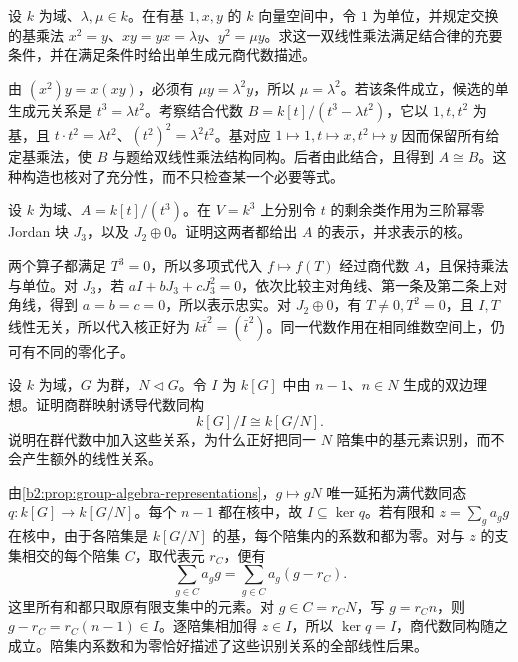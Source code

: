 \begin{exercise}\label{b2:ex:11-associative-table}
	设 \(k\) 为域、\(\lambda,\mu\in k\)。在有基 \(1,x,y\) 的 \(k\) 向量空间中，令 \(1\) 为单位，并规定交换的基乘法 \(x^2=y\)、\(xy=yx=\lambda y\)、\(y^2=\mu y\)。求这一双线性乘法满足结合律的充要条件，并在满足条件时给出单生成元商代数描述。
\end{exercise}
\begin{solution}
	由 \((x^2)y=x(xy)\)，必须有 \(\mu y=\lambda^2y\)，所以 \(\mu=\lambda^2\)。若该条件成立，候选的单生成元关系是 \(t^3=\lambda t^2\)。考察结合代数 \(B=k[t]/(t^3-\lambda t^2)\)，它以 \(1,t,t^2\) 为基，且 \(t\cdot t^2=\lambda t^2\)、\((t^2)^2=\lambda^2t^2\)。基对应 \(1\mapsto1,t\mapsto x,t^2\mapsto y\) 因而保留所有给定基乘法，使 \(B\) 与题给双线性乘法结构同构。后者由此结合，且得到 \(A\cong B\)。这种构造也核对了充分性，而不只检查某一个必要等式。
\end{solution}

\begin{exercise}\label{b2:ex:11-nilpotent-representation}
	设 \(k\) 为域、\(A=k[t]/(t^3)\)。在 \(V=k^3\) 上分别令 \(t\) 的剩余类作用为三阶幂零 Jordan 块 \(J_3\)，以及 \(J_2\oplus0\)。证明这两者都给出 \(A\) 的表示，并求表示的核。
\end{exercise}
\begin{solution}
	两个算子都满足 \(T^3=0\)，所以多项式代入 \(f\mapsto f(T)\) 经过商代数 \(A\)，且保持乘法与单位。对 \(J_3\)，若 \(aI+bJ_3+cJ_3^2=0\)，依次比较主对角线、第一条及第二条上对角线，得到 \(a=b=c=0\)，所以表示忠实。对 \(J_2\oplus0\)，有 \(T\ne0,T^2=0\)，且 \(I,T\) 线性无关，所以代入核正好为 \(k\bar t^2=(\bar t^2)\)。同一代数作用在相同维数空间上，仍可有不同的零化子。
\end{solution}

\begin{exercise}\label{b2:ex:11-group-algebra-universal}
	设 \(k\) 为域，\(G\) 为群，\(N\triangleleft G\)。令 \(I\) 为 \(k[G]\) 中由 \(n-1\)、\(n\in N\) 生成的双边理想。证明商群映射诱导代数同构
	\[
		k[G]/I\cong k[G/N].
	\]
	说明在群代数中加入这些关系，为什么正好把同一 \(N\) 陪集中的基元素识别，而不会产生额外的线性关系。
\end{exercise}
\begin{solution}
	由\cref{b2:prop:group-algebra-representations}，\(g\mapsto gN\) 唯一延拓为满代数同态 \(q:k[G]\to k[G/N]\)。每个 \(n-1\) 都在核中，故 \(I\subseteq\ker q\)。若有限和 \(z=\sum_g a_gg\) 在核中，由于各陪集是 \(k[G/N]\) 的基，每个陪集内的系数和都为零。对与 \(z\) 的支集相交的每个陪集 \(C\)，取代表元 \(r_C\)，便有
	\[
		\sum_{g\in C}a_gg =\sum_{g\in C}a_g(g-r_C).
	\]
	这里所有和都只取原有限支集中的元素。对 \(g\in C=r_CN\)，写 \(g=r_Cn\)，则 \(g-r_C=r_C(n-1)\in I\)。逐陪集相加得 \(z\in I\)，所以 \(\ker q=I\)，商代数同构随之成立。陪集内系数和为零恰好描述了这些识别关系的全部线性后果。
\end{solution}

